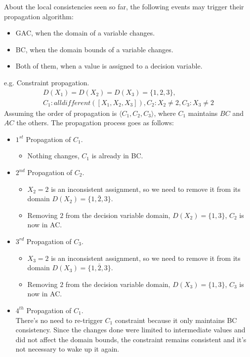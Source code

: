 About the local consistencies seen so far, the following events may trigger their propagation algorithm:
\begin{itemize}
    \renewcommand{\labelitemi}{-}
    \item GAC, when the domain of a variable changes.
    \item BC, when the domain bounds of a variable changes.
    \item Both of them, when a value is assigned to a decision variable.
\end{itemize}
\begin{example}
    e.g. Constraint propagation.
    $$
        \begin{gathered}
            D(X_1) = D(X_2) = D(X_3) = \{1, 2, 3\}, \\
            C_1: \textit{alldifferent}([X_1, X_2, X_3]), C_2: X_2 \neq 2, C_3: X_3 \neq 2
        \end{gathered}
    $$
    Assuming the order of propagation is $\langle C_1, C_2, C_3 \rangle$, where $C_1$ maintains $BC$ and $AC$ the others. The propagation process goes as follows:
    \begin{itemize}
        \renewcommand{\labelitemi}{}
        \item $1^{st}$ Propagation of $C_1$. 
        \begin{itemize}
            \item Nothing changes, $C_1$ is already in BC. 
        \end{itemize}
        \item $2^{nd}$ Propagation of $C_2$. 
        \begin{itemize}
            \item $X_2 = 2$ is an inconsistent assignment, so we need to remove it from its domain $D(X_2) = \{1, \bar{2}, 3\}$.
            \item Removing $2$ from the decision variable domain, $D(X_2) = \{1, 3\}$, $C_2$ is now in AC.
        \end{itemize}
        \item $3^{rd}$ Propagation of $C_3$.
        \begin{itemize}
            \item $X_3 = 2$ is an inconsistent assignment, so we need to remove it from its domain $D(X_3) = \{1, \bar{2}, 3\}$.
            \item Removing $2$ from the decision variable domain, $D(X_3) = \{1, 3\}$, $C_3$ is now in AC.
        \end{itemize}
        \item $4^{th}$ Propagation of $C_1$. \\ There's no need to re-trigger $C_1$ constraint because it only maintains BC consistency. Since the changes done were limited to intermediate values and did not affect the domain bounds, the constraint remains consistent and it's not necessary to wake up it again.
    \end{itemize}
\end{example}
